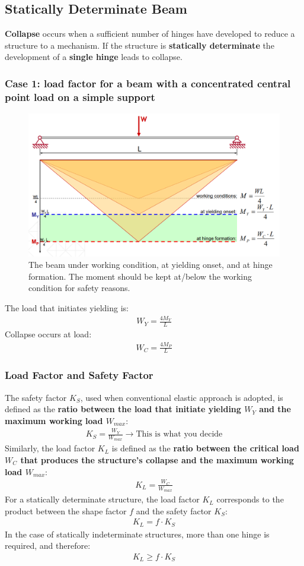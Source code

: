 \documentclass[class=report, crop=false, 12pt,a4paper]{standalone}
\begin{document}
\subsection{Statically Determinate Beam}
\textbf{Collapse} occurs when a sufficient number of hinges have developed to reduce a structure to a mechanism. If the structure is \textbf{statically determinate} the development of a \textbf{single hinge} leads to collapse.
\subsubsection{\large Case 1: load factor for a beam with a concentrated central point load on a simple support}
\begin{figure}[H]
  \centering
  \includegraphics[width = 0.8 \textwidth]{../img/beam26.PNG}
  \caption{The beam under working condition, at yielding onset, and at hinge formation. The moment should be kept at/below the working condition for safety reasons.}
\end{figure}
The load that initiates yielding is:
\begin{gather}
  W_Y = \frac{4M_Y}{L}
\end{gather}
Collapse occurs at load:
\begin{gather}
  W_C = \frac{4M_P}{L}
\end{gather}
\subsubsection{\large Load Factor and Safety Factor}
The safety factor $K_S$, used when conventional elastic approach is adopted, is defined as the \textbf{ratio between the load that initiate yielding $W_Y$ and the maximum working load $W_{max}$}:
\begin{gather}
  K_S = \frac{W_Y}{W_{max}} \longrightarrow \text{This is what you decide}
\end{gather}
Similarly, the load factor $K_L$ is defined as the \textbf{ratio between the critical load $W_C$ that produces the structure’s collapse and the maximum working load $W_{max}$}:
\begin{gather}
  K_L = \frac{W_C}{W_{max}}
\end{gather}
For a statically determinate structure, the load factor $K_L$ corresponds to the product between the shape factor $f$ and the safety factor $K_S$: 
\begin{gather}
  K_L = f\cdot K_S
\end{gather}
In the case of statically indeterminate structures, more than one hinge is required, and therefore:
\begin{gather}
  K_L \geq f\cdot K_S
\end{gather}
\end{document}
